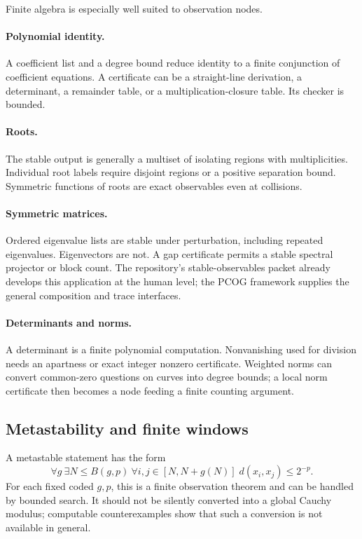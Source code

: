 Finite algebra is especially well suited to observation nodes.

\paragraph{Polynomial identity.}
A coefficient list and a degree bound reduce identity to a finite conjunction
of coefficient equations.  A certificate can be a straight-line derivation,
a determinant, a remainder table, or a multiplication-closure table.  Its
checker is bounded.

\paragraph{Roots.}
The stable output is generally a multiset of isolating regions with
multiplicities.  Individual root labels require disjoint regions or a positive
separation bound.  Symmetric functions of roots are exact observables even at
collisions.

\paragraph{Symmetric matrices.}
Ordered eigenvalue lists are stable under perturbation, including repeated
eigenvalues.  Eigenvectors are not.  A gap certificate permits a stable
spectral projector or block count.  The repository's stable-observables packet
already develops this application at the human level; the PCOG framework
supplies the general composition and trace interfaces.

\paragraph{Determinants and norms.}
A determinant is a finite polynomial computation.  Nonvanishing used for
division needs an apartness or exact integer nonzero certificate.  Weighted
norms can convert common-zero questions on curves into degree bounds; a local
norm certificate then becomes a node feeding a finite counting argument.

\subsection{Metastability and finite windows}

A metastable statement has the form
\[
 \forall g\ \exists N\leq B(g,p)\ \forall i,j\in[N,N+g(N)]\;
 d(x_i,x_j)\leq2^{-p}.
\]
For each fixed coded \(g,p\), this is a finite observation theorem and can be
handled by bounded search.  It should not be silently converted into a global
Cauchy modulus; computable counterexamples show that such a conversion is not
available in general.

